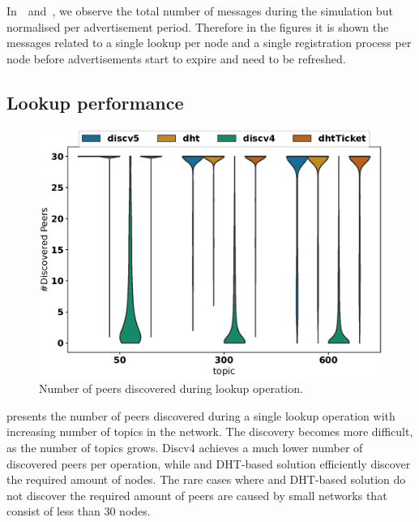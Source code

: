 In~~and~, we observe the total number of messages during the simulation but normalised per advertisement period. Therefore in the figures it is shown the messages related to a single lookup per node and a single registration process per node before advertisements start to expire and need to be refreshed.


\subsection{Lookup performance}



\begin{figure}[!h]
\includegraphics[width=\linewidth]{results/efficiency/violin_topic_discovered.eps}
\caption{Number of peers discovered during lookup operation.}
\label{fig:discoveredPerTopic}
\end{figure}

 presents the number of peers discovered during a single lookup operation with increasing number of topics in the network. The discovery becomes more difficult, as the number of topics grows. Discv4 achieves a much lower number of discovered peers per operation, while \sysname and DHT-based solution efficiently discover the required amount of nodes. The rare cases where \sysname and DHT-based solution do not discover the required amount of peers are caused by small networks that consist of less than 30 nodes. 


